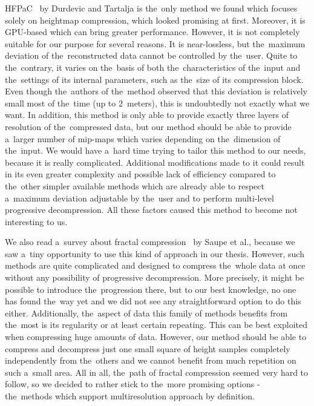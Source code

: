  HFPaC~\cite{fieldGPU} by Durdevic and Tartalja is the~only method we found which focuses solely on heightmap compression, which looked promising at first. Moreover, it is GPU-based which can bring greater performance. However, it is not completely suitable for our purpose for several reasons. It is near-lossless, but the~maximum deviation of the~reconstructed data cannot be controlled by the~user. Quite to the~contrary, it varies on the~basis of both the~characteristics of the~input and the~settings of its internal parameters, such as the~size of its compression block. Even though the~authors of the~method observed that this deviation is relatively small most of the~time (up to 2~meters), this is undoubtedly not exactly what we want. In addition, this method is only able to provide exactly three layers of resolution of the~compressed data, but our method should be able to provide a~larger number of mip-maps which varies depending on the~dimension of the~input. We would have a~hard time trying to tailor this method to our needs, because it is really complicated. Additional modifications made to it could result in its even greater complexity and possible lack of efficiency compared to the~other simpler available methods which are already able to respect a~maximum deviation adjustable by the~user and to perform multi-level progressive decompression. All these factors caused this method to become not interesting to us.
 
 We also read a~survey about fractal compression~\cite{fractal} by Saupe et al., because we saw a~tiny opportunity to use this kind of approach in our thesis. However, such methods are quite complicated and designed to compress the~whole data at once without any possibility of progressive decompression. More precisely, it might be possible to introduce the~progression there, but to our best knowledge, no one has found the~way yet and we did not see any straightforward option to do this either. Additionally, the~aspect of data this family of methods benefits from the~most is its regularity or at least certain repeating. This can be best exploited when compressing huge amounts of data. However, our method should be able to compress and decompress just one small square of height samples completely independently from the~others and we cannot benefit from much repetition on such a~small area. All in all, the~path of fractal compression seemed very hard to follow, so we decided to rather stick to the~more promising options - the~methods which support multiresolution approach by definition.
 
